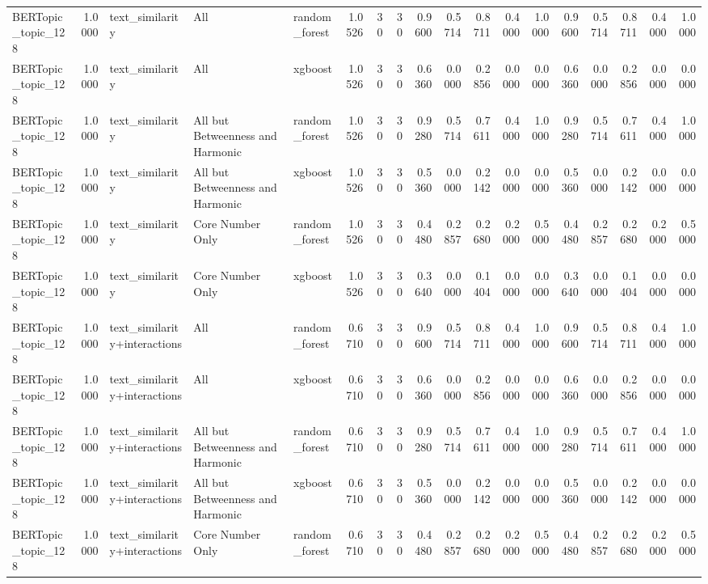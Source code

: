 \begin{tabular}{lrlllrrrrrrrrrrrrr}
BERTopic_topic_128 & 1.0000 & text_similarity & All & random_forest & 1.0526 & 30 & 30 & 0.9600 & 0.5714 & 0.8711 & 0.4000 & 1.0000 & 0.9600 & 0.5714 & 0.8711 & 0.4000 & 1.0000 \\
BERTopic_topic_128 & 1.0000 & text_similarity & All & xgboost & 1.0526 & 30 & 30 & 0.6360 & 0.0000 & 0.2856 & 0.0000 & 0.0000 & 0.6360 & 0.0000 & 0.2856 & 0.0000 & 0.0000 \\
BERTopic_topic_128 & 1.0000 & text_similarity & All but Betweenness and Harmonic & random_forest & 1.0526 & 30 & 30 & 0.9280 & 0.5714 & 0.7611 & 0.4000 & 1.0000 & 0.9280 & 0.5714 & 0.7611 & 0.4000 & 1.0000 \\
BERTopic_topic_128 & 1.0000 & text_similarity & All but Betweenness and Harmonic & xgboost & 1.0526 & 30 & 30 & 0.5360 & 0.0000 & 0.2142 & 0.0000 & 0.0000 & 0.5360 & 0.0000 & 0.2142 & 0.0000 & 0.0000 \\
BERTopic_topic_128 & 1.0000 & text_similarity & Core Number Only & random_forest & 1.0526 & 30 & 30 & 0.4480 & 0.2857 & 0.2680 & 0.2000 & 0.5000 & 0.4480 & 0.2857 & 0.2680 & 0.2000 & 0.5000 \\
BERTopic_topic_128 & 1.0000 & text_similarity & Core Number Only & xgboost & 1.0526 & 30 & 30 & 0.3640 & 0.0000 & 0.1404 & 0.0000 & 0.0000 & 0.3640 & 0.0000 & 0.1404 & 0.0000 & 0.0000 \\
BERTopic_topic_128 & 1.0000 & text_similarity+interactions & All & random_forest & 0.6710 & 30 & 30 & 0.9600 & 0.5714 & 0.8711 & 0.4000 & 1.0000 & 0.9600 & 0.5714 & 0.8711 & 0.4000 & 1.0000 \\
BERTopic_topic_128 & 1.0000 & text_similarity+interactions & All & xgboost & 0.6710 & 30 & 30 & 0.6360 & 0.0000 & 0.2856 & 0.0000 & 0.0000 & 0.6360 & 0.0000 & 0.2856 & 0.0000 & 0.0000 \\
BERTopic_topic_128 & 1.0000 & text_similarity+interactions & All but Betweenness and Harmonic & random_forest & 0.6710 & 30 & 30 & 0.9280 & 0.5714 & 0.7611 & 0.4000 & 1.0000 & 0.9280 & 0.5714 & 0.7611 & 0.4000 & 1.0000 \\
BERTopic_topic_128 & 1.0000 & text_similarity+interactions & All but Betweenness and Harmonic & xgboost & 0.6710 & 30 & 30 & 0.5360 & 0.0000 & 0.2142 & 0.0000 & 0.0000 & 0.5360 & 0.0000 & 0.2142 & 0.0000 & 0.0000 \\
BERTopic_topic_128 & 1.0000 & text_similarity+interactions & Core Number Only & random_forest & 0.6710 & 30 & 30 & 0.4480 & 0.2857 & 0.2680 & 0.2000 & 0.5000 & 0.4480 & 0.2857 & 0.2680 & 0.2000 & 0.5000 \\

\end{tabular}
